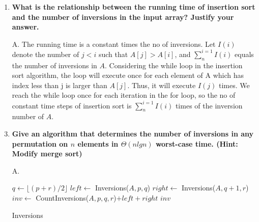 \documentclass[fontsize=12pt,paper=a4,open=any]{book}
\begin{document}
\begin{enumerate}
\begin{enumerate}
		\item \textbf{What is the relationship between the running time of insertion sort and the number of inversions in the input array? Justify your answer.}
		\item[A.]
		The running time is a constant times the no of inversions. Let $I(i)$ denote the number of $j < i$ such that $A[j] > A[i]$, and $\sum_{n}^{i=1} I(i)$ equals the number of inversions in $A$. Considering the while loop in the insertion sort algorithm, the loop will execute once for each element of A which has index less than j is larger than $A[j]$. Thus, it will execute $I(j)$ times. We reach the while loop once for each iteration in the for loop, so the no of constant time steps of insertion sort is  $\sum_{n}^{i=1} I(i)$ times of the inversion number of $A$.
		
		\item \textbf{Give an algorithm that determines the number of inversions in any permutation on $n$ elements in $\Theta(n lg n)$ worst-case time. (Hint: Modify merge sort)}
		\item[A.]
		\begin{algorithm}[H]
		
		{
			$q \longleftarrow \lfloor (p+r)/2 \rfloor $\;
			$left \longleftarrow$ Inversions($A, p, q$)\;
			$right \longleftarrow$ Inversions($A, q+1, r$)\;
			$inv \longleftarrow$ CountInversions($A, p, q, r$)$ + left + right$\;
			\Return $inv$\;
		}
		\;
		\caption{Inversions}
		\end{algorithm}
		
		\begin{algorithm}[H]
		

\end{algorithm}
\end{enumerate}
\end{enumerate}
\end{document}
